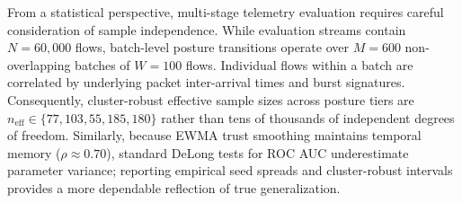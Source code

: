 \documentclass[journal,10pt,onecolumn]{IEEEtran}
\begin{document}
From a statistical perspective, multi-stage telemetry evaluation requires careful consideration of sample independence. While evaluation streams contain $N=60,000$ flows, batch-level posture transitions operate over $M=600$ non-overlapping batches of $W=100$ flows. Individual flows within a batch are correlated by underlying packet inter-arrival times and burst signatures. Consequently, cluster-robust effective sample sizes across posture tiers are $n_{\text{eff}} \in \{77, 103, 55, 185, 180\}$ rather than tens of thousands of independent degrees of freedom. Similarly, because EWMA trust smoothing maintains temporal memory ($\rho \approx 0.70$), standard DeLong tests for ROC AUC underestimate parameter variance; reporting empirical seed spreads and cluster-robust intervals provides a more dependable reflection of true generalization.
\end{document}
